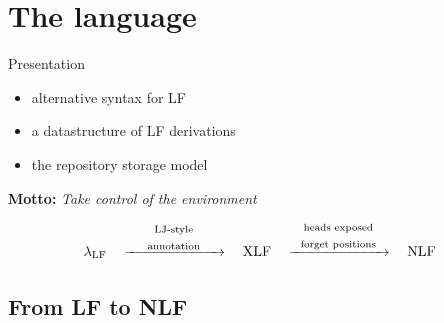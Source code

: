 \documentclass[ignorenonframetext,red]{beamer}
\begin{document}
\section{The language}

\begin{frame}{Presentation}
  \begin{itemize}
  \item alternative syntax for LF
  \item a datastructure of LF derivations
  \item the repository storage model
  \end{itemize}
  \vspace{2em}
  \begin{center}
    \textbf{Motto: }{\large \it Take control of the environment}
  \end{center}
  \vspace{3em}
  \large
  \[
  \lambda_{\text{LF}}
  \quad\xrightarrow{\text{
      \begin{minipage}{20ex}
        \begin{center}
          LJ-style\\
          annotation
        \end{center}
      \end{minipage}
    }}\quad
  \text{XLF}
  \quad\xrightarrow{\text{
      \begin{minipage}{20ex}
        \begin{center}
          heads exposed\\
          forget positions
        \end{center}
      \end{minipage}
    }}\quad
  \text{NLF}
  \]
\end{frame}

\subsection{From LF to NLF}
\end{document}
